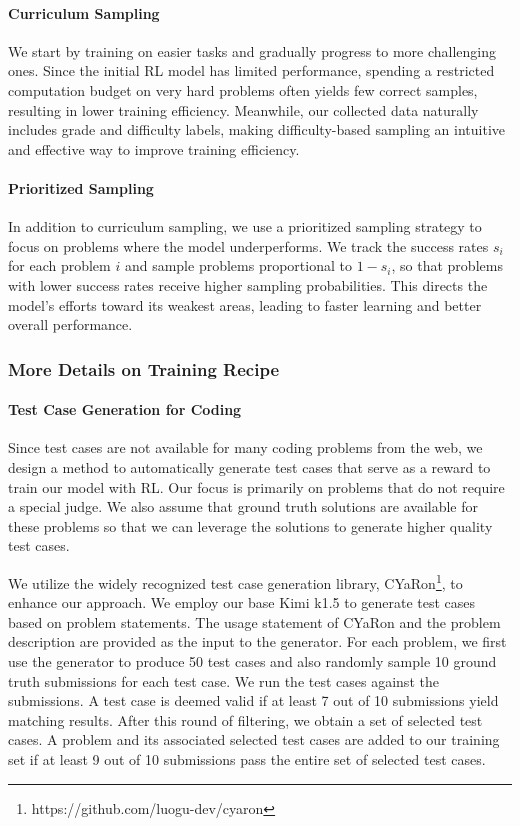 \documentclass{article}
\begin{document}
\paragraph{Curriculum Sampling}
We start by training on easier tasks and gradually progress to more challenging ones. Since the initial RL model has limited performance, spending a restricted computation budget on very hard problems often yields few correct samples, resulting in lower training efficiency. Meanwhile, our collected data naturally includes grade and difficulty labels, making difficulty-based sampling an intuitive and effective way to improve training efficiency.

\paragraph{Prioritized Sampling}
In addition to curriculum sampling, we use a prioritized sampling strategy to focus on problems where the model underperforms. We track the success rates \(s_i\) for each problem \(i\) and sample problems proportional to $1-s_i$, 
so that problems with lower success rates receive higher sampling probabilities. This directs the model’s efforts toward its weakest areas, leading to faster learning and better overall performance.

\subsubsection{More Details on Training Recipe}

\paragraph{Test Case Generation for Coding}

Since test cases are not available for many coding problems from the web, we design a method to automatically generate test cases that serve as a reward to train our model with RL. Our focus is primarily on problems that do not require a special judge. We also assume that ground truth solutions are available for these problems so that we can leverage the solutions to generate higher quality test cases.

We utilize the widely recognized test case generation library, CYaRon\footnote{https://github.com/luogu-dev/cyaron}, to enhance our approach. We employ our base Kimi k1.5 to generate test cases based on problem statements. The usage statement of CYaRon and the problem description are provided as the input to the generator. For each problem, we first use the generator to produce 50 test cases and also randomly sample 10 ground truth submissions for each test case. We run the test cases against the submissions. A test case is deemed valid if at least 7 out of 10 submissions yield matching results. After this round of filtering, we obtain a set of selected test cases. A problem and its associated selected test cases are added to our training set if at least 9 out of 10 submissions pass the entire set of selected test cases.
\end{document}
